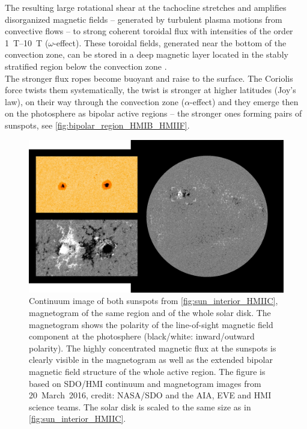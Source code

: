 The resulting large rotational shear at the tachocline stretches and amplifies disorganized magnetic fields -- generated by turbulent plasma motions from convective flows -- to strong coherent toroidal flux with intensities of the order \SIrange{1}{10}{\tesla} ($\omega$-effect). These toroidal fields, generated near the bottom of the convection zone, can be stored in a deep magnetic layer located in the stably stratified region below the convection zone \citep{Ossendrijver2003}.\\
The stronger flux ropes become buoyant and raise to the surface. The Coriolis force twists them systematically, the twist is stronger at higher latitudes (Joy's law), on their way through the convection zone ($\alpha$-effect) and they emerge then on the photosphere as bipolar active regions -- the stronger ones forming pairs of sunspots, see \autoref{fig:bipolar_region_HMIB_HMIIF}.
\begin{figure}[htb]
	\centering
	\includegraphics[width=\textwidth]{images/own_figures/bipolar_region_HMIB_HMIIF.png}
	\caption{Continuum image of both sunspots from \autoref{fig:sun_interior_HMIIC}, magnetogram of the same region and of the whole solar disk. The magnetogram shows the polarity of the line-of-sight magnetic field component at the photosphere (black/white: inward/outward polarity). The highly concentrated magnetic flux at the sunspots is clearly visible in the magnetogram as well as the extended bipolar magnetic field structure of the whole active region. The figure is based on SDO/HMI continuum and magnetogram images from 20~March~2016, credit: NASA/SDO and the AIA, EVE and HMI science teams. The solar disk is scaled to the same size as in \autoref{fig:sun_interior_HMIIC}.}
	\label{fig:bipolar_region_HMIB_HMIIF}
\end{figure}

